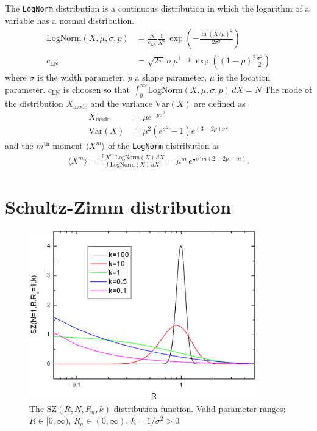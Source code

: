 The \texttt{LogNorm} distribution is a continuous distribution in
which the logarithm of a variable has a normal distribution.
\begin{subequations}
\begin{align}
\text{LogNorm}(X,\mu,\sigma,p) &=  \frac{N}{c_\text{LN}}
                                    \frac{1}{X^{p}}\,
                                    \exp\!\!\left(-\frac{\ln(X/\mu)^2}{2\sigma^2}\right) \\
c_\text{LN} &= \sqrt{2\pi}\,\sigma \,\mu^{1-p}
\,\exp\!\!\left((1-p)^2\frac{\sigma^2}{2}\right)
\label{eq:LogNormal}
\end{align}
\end{subequations}
where $\sigma$ is the width parameter, $p$ a shape parameter, $\mu$ is the location parameter.
$c_\text{LN}$ is choosen so that $\int_0^\infty\! \text{LogNorm}(X,\mu,\sigma,p)\,dX = N$
The mode of the distribution $X_\text{mode}$ and the variance
$\text{Var}(X)$ are defined as
\begin{align}
X_\text{mode} &= \mu e^{-p \sigma^2} \\
\text{Var}(X) &= \mu ^2 \left(e^{\sigma^2}-1\right) e^{(3-2 p) \sigma^2}
\end{align}
and the $m^\text{th}$ moment $\langle X^m\rangle$ of the \texttt{LogNorm} distribution as
\begin{align}
\langle X^m\rangle = \frac{\int X^m\, \textrm{LogNorm}(X)\, dX}{\int \textrm{LogNorm}(X)\, dX} =
\mu^m \, e^{\frac{1}{2} \sigma^2 m (2 - 2 p + m)}.
\label{eq:nMoment:LogNormal}
\end{align}

\clearpage
\section{Schultz-Zimm distribution}

\begin{figure}[htb]
\begin{center}
\includegraphics[width=0.876\textwidth,height=0.658\textwidth]{SZ.png}
\end{center}
\caption{The $\text{SZ}(R,N,R_a,k)$ distribution function. Valid
parameter ranges: $R \in [0,\infty)$, $R_a \in (0,\infty)$,
$k=1/\sigma^2 > 0$} \label{NogNormal}
\end{figure}

